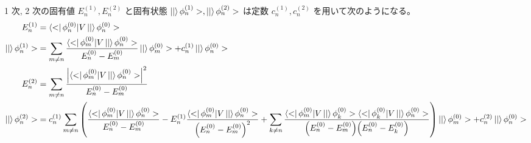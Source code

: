 \documentclass[uplatex,dvipdfmx,a4paper,11pt]{jlreq}
\numberwithin{equation}{section}
\theoremstyle{definition}
\begin{document}
\begin{proposition}
  1 次, 2 次の固有値 $E_n^{(1)}, E_n^{(2)}$ と固有状態 $\ket|\phi_n^{(1)}>, \ket|\phi_n^{(2)}>$ は定数 $c_n^{(1)}, c_n^{(2)}$ を用いて次のようになる。
  \begin{align}
    E_n^{(1)}          & = \bra<\phi_n^{(0)}|V\ket|\phi_n^{(0)}>                                                                                                                                                                                                                                                                                                                                                             \\
    \ket|\phi_n^{(1)}> & = \sum_{m\neq n}\frac{\bra<\phi_m^{(0)}|V\ket|\phi_n^{(0)}>}{E_n^{(0)} - E_m^{(0)}}\ket|\phi_m^{(0)}> + c_n^{(1)}\ket|\phi_n^{(0)}>                                                                                                                                                                                                                                                                 \\
    E_n^{(2)}          & = \sum_{m\neq n}\frac{\qty|{\bra<\phi_m^{(0)}|V\ket|\phi_n^{(0)}>}|^2}{E_n^{(0)} - E_m^{(0)}}                                                                                                                                                                                                                                                                                                       \\
    \ket|\phi_n^{(2)}> & = c_n^{(1)}\sum_{m\neq n}\qty(\frac{\bra<\phi_m^{(0)}|V\ket|\phi_n^{(0)}>}{E_n^{(0)} - E_m^{(0)}} - E_n^{(1)}\frac{\bra<\phi_m^{(0)}|V\ket|\phi_n^{(0)}>}{\qty(E_n^{(0)} - E_m^{(0)})^2} + \sum_{k\neq n}\frac{\bra<\phi_m^{(0)}|V\ket|\phi_k^{(0)}>\bra<\phi_k^{(0)}|V\ket|\phi_n^{(0)}>}{\qty(E_n^{(0)} - E_m^{(0)})\qty(E_n^{(0)} - E_k^{(0)})})\ket|\phi_m^{(0)}> + c_n^{(2)}\ket|\phi_n^{(0)}>
  \end{align}
\end{proposition}
\end{document}
